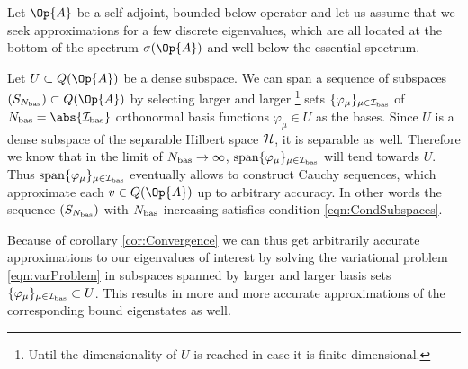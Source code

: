 \begin{rem}
	\label{rem:ApproxBottomDiscrete}
	Let $\Op{A}$ be a self-adjoint, bounded below operator
	and let us assume that we seek approximations
	for a few discrete eigenvalues,
	which are all located at the bottom of the spectrum $\sigma(\Op{A})$
	and well below the essential spectrum.

	Let $U \subset Q(\Op{A})$ be a dense subspace.
	We can span a sequence of subspaces $(S_{\Nbas}) \subset Q(\Op{A})$
	by selecting larger and larger%
	\footnote{Until the dimensionality of $U$ is reached
		in case it is finite-dimensional.}
	sets $\{\varphi_\mu\}_{\mu \in \mathcal{I}_\text{bas}}$
	of $\Nbas = \abs{\Ibas}$ orthonormal basis functions $\varphi_\mu \in U$
	as the bases.
	Since $U$ is a dense subspace of the separable Hilbert space
	$\mathcal{H}$, it is separable as well.
	Therefore we know that
	in the limit of $N_\text{bas} \to \infty$,
	$\operatorname{span} \{\varphi_\mu\}_{\mu \in \mathcal{I}_\text{bas}}$ will tend towards $U$.
	Thus $\operatorname{span} \{\varphi_\mu\}_{\mu \in \mathcal{I}_\text{bas}}$ eventually allows
	to construct Cauchy sequences, which approximate each $v \in Q(\Op{A})$
	up to arbitrary accuracy.
	In other words the sequence $(S_{N_\text{bas}})$ with $N_\text{bas}$ increasing
	satisfies condition \eqref{eqn:CondSubspaces}.

	Because of corollary \ref{cor:Convergence}
	we can thus get arbitrarily accurate approximations
	to our eigenvalues of interest
	by solving the variational problem \eqref{eqn:varProblem}
	in subspaces spanned by larger and larger
	basis sets $\{\varphi_\mu\}_{\mu \in \mathcal{I}_\text{bas}} \subset U$.
	This results in more and more accurate approximations
	of the corresponding bound eigenstates as well.
\end{rem}

